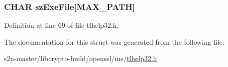 \subsubsection[{\texorpdfstring{sz\+Exe\+File}{szExeFile}}]{\setlength{\rightskip}{0pt plus 5cm}C\+H\+AR sz\+Exe\+File\mbox{[}M\+A\+X\+\_\+\+P\+A\+TH\mbox{]}}\hypertarget{structtag_p_r_o_c_e_s_s_e_n_t_r_y32_ab45f9004418e1d09cdffce8e17e597a3}{}\label{structtag_p_r_o_c_e_s_s_e_n_t_r_y32_ab45f9004418e1d09cdffce8e17e597a3}


Definition at line 69 of file tlhelp32.\+h.



The documentation for this struct was generated from the following file\+:\begin{DoxyCompactItemize}
\item 
s2n-\/master/libcrypto-\/build/openssl/ms/\hyperlink{tlhelp32_8h}{tlhelp32.\+h}\end{DoxyCompactItemize}
